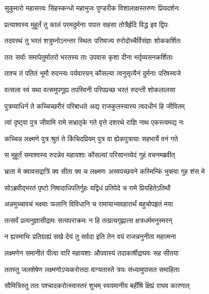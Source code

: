 \twolineshloka
{सुकुमारो महासत्त्वः सिंहस्कन्धो महाभुजः}
{पुण्डरीक विशालाक्षस्तरुणः प्रियदर्शनः} %

\twolineshloka
{प्रत्याश्वस्य मुहूर्तं तु कालं परमदुर्मनाः}
{पपात सहसा तोत्रैर्हृदि विद्ध इव द्विपः} %

\twolineshloka
{तदवस्थं तु भरतं शत्रुघ्नोऽनन्तर स्थितः}
{परिष्वज्य रुरोदोच्चैर्विसंज्ञः शोककर्शितः} %

\twolineshloka
{ततः सर्वाः समापेतुर्मातरो भरतस्य ताः}
{उपवास कृशा दीना भर्तृव्यसनकर्शिताः} %

\twolineshloka
{ताश्च तं पतितं भूमौ रुदन्त्यः पर्यवारयन्}
{कौसल्या त्वनुसृत्यैनं दुर्मनाः परिषस्वजे} %

\twolineshloka
{वत्सला स्वं यथा वत्समुपगूह्य तपस्विनी}
{परिपप्रच्छ भरतं रुदन्ती शोकलालसा} %

\twolineshloka
{पुत्रव्याधिर्न ते कच्चिच्छरीरं परिबाधते}
{अद्य राजकुलस्यास्य त्वदधीनं हि जीवितम्} %

\twolineshloka
{त्वां दृष्ट्वा पुत्र जीवामि रामे सभ्रातृके गते}
{वृत्ते दशरथे राज्ञि नाथ एकस्त्वमद्य नः} %

\twolineshloka
{कच्चिन्न लक्ष्मणे पुत्र श्रुतं ते किंचिदप्रियम्}
{पुत्र वा ह्येकपुत्रायाः सहभार्ये वनं गते} %

\twolineshloka
{स मुहूर्तं समाश्वस्य रुदन्नेव महायशाः}
{कौसल्यां परिसान्त्व्येदं गुहं वचनमब्रवीत्} %

\twolineshloka
{भ्राता मे क्वावसद्रात्रिं क्व सीता क्व च लक्ष्मणः}
{अस्वपच्छयने कस्मिन्किं भुक्त्वा गुह शंस मे} %

\twolineshloka
{सोऽब्रवीद्भरतं पृष्टो निषादाधिपतिर्गुहः}
{यद्विधं प्रतिपेदे च रामे प्रियहितेऽतिथौ} %

\twolineshloka
{अन्नमुच्चावचं भक्ष्याः फलानि विविधानि च}
{रामायाभ्यवहारार्थं बहुचोपहृतं मया} %

\twolineshloka
{तत्सर्वं प्रत्यनुज्ञासीद्रामः सत्यपराक्रमः}
{न हि तत्प्रत्यगृह्णात्स क्षत्रधर्ममनुस्मरन्} %

\twolineshloka
{न ह्यस्माभिः प्रतिग्राह्यं सखे देयं तु सर्वदा}
{इति तेन वयं राजन्ननुनीता महात्मना} %

\twolineshloka
{लक्ष्मणेन समानीतं पीत्वा वारि महायशाः}
{औपवास्यं तदाकार्षीद्राघवः सह सीतया} %

\twolineshloka
{ततस्तु जलशेषेण लक्ष्मणोऽप्यकरोत्तदा}
{वाग्यतास्ते त्रयः संध्यामुपासत समाहिताः} %

\twolineshloka
{सौमित्रिस्तु ततः पश्चादकरोत्स्वास्तरं शुभम्}
{स्वयमानीय बर्हींषि क्षिप्रं राघव कारणात्} %

